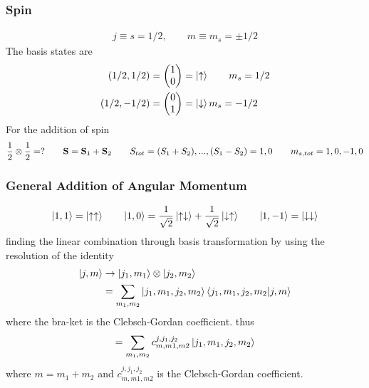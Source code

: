 \documentclass[../main.tex]{subfiles}
\begin{document}
\subsubsection*{Spin}
\begin{align*}
    j \equiv s = 1/2, \qquad m \equiv m_s = \pm 1/2
\end{align*}
The basis states are
\begin{align*}
    (1/2, 1/2) &= \mqty(1 \\ 0) = \ket{\uparrow}  \qquad m_s = 1/2 \\
    (1/2, -1/2) &= \mqty(0 \\ 1) = \ket{\downarrow} m_s = -1/2
\end{align*}
For the addition of spin
\begin{align*}
    \frac{1}{2} \otimes \frac{1}{2} = ? \qquad \vb{S} = \vb{S}_1 + \vb{S}_2 \qquad 
    S_{tot} = (S_1 + S_2), ... , (S_1 - S_2) = 1, 0 \qquad
    m_{s, tot} = 1, 0, -1, 0
\end{align*}
\subsubsection*{General Addition of Angular Momentum}
\begin{align*}
    \ket{1,1} = \ket{\uparrow \uparrow} \qquad \ket{1,0} = \frac{1}{\sqrt{2}} \ket{\uparrow \downarrow} + \frac{1}{\sqrt{2}} \ket{\downarrow \uparrow} \qquad \ket{1,-1} = \ket{\downarrow \downarrow}
\end{align*}
finding the linear combination through basis transformation by using the resolution of the identity
\begin{align*}
    \ket{j,m} &\to \ket{j_1, m_1} \otimes \ket{j_2, m_2} \\
    &= \sum_{m_1, m_2} \ket{j_1, m_1, j_2, m_2} \bra{j_1, m_1, j_2, m_2} \ket{j,m}
\end{align*}
where the bra-ket is the Clebsch-Gordan coefficient. thus
\begin{align*}
    = \sum_{m_1, m_2} c_{m, m1, m2}^{j, j_1, j_2} \ket{j_1, m_1, j_2, m_2}
\end{align*}
where $m = m_1 + m_2$ and $c_{m, m1, m2}^{j, j_1, j_2}$ is the Clebsch-Gordan coefficient.
\end{document}
